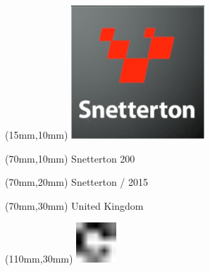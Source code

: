 \null\newpage
\begin{textblock*}{50mm}(15mm,10mm)%
\includegraphics[width=50mm]{LG/2015-05-20_00095.png}
\end{textblock*}
\begin{textblock*}{130mm}(70mm,10mm)%
{\fontsize{20}{20}\selectfont Snetterton 200}\\
\end{textblock*}
\begin{textblock*}{120mm}(70mm,20mm)%
{\fontsize{16}{16}\selectfont Snetterton / 2015}\\
\end{textblock*}
\begin{textblock*}{120mm}(70mm,30mm)%
{\fontsize{12}{12}\selectfont United Kingdom}
\end{textblock*}
\begin{textblock*}{30mm}(110mm,30mm)%
\centering
\includegraphics[height=15mm]{icons/fa-rotate-right.pdf}
\end{textblock*}
